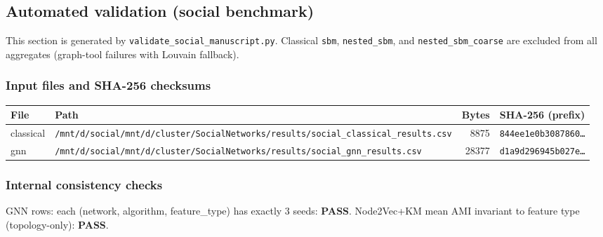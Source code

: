 \subsection{Automated validation (social benchmark)}
This section is generated by \texttt{validate\_social\_manuscript.py}. Classical \texttt{sbm}, \texttt{nested\_sbm}, and \texttt{nested\_sbm\_coarse} are excluded from all aggregates (graph-tool failures with Louvain fallback).
\subsubsection{Input files and SHA-256 checksums}
\footnotesize
\begin{tabular}{lp{8cm}rr}
\toprule
\textbf{File} & \textbf{Path} & \textbf{Bytes} & \textbf{SHA-256 (prefix)} \\
\midrule
classical & \texttt{/mnt/d/social/mnt/d/cluster/SocialNetworks/results/social\_classical\_results.csv} & 8875 & \texttt{844ee1e0b3087860\ldots} \\
gnn & \texttt{/mnt/d/social/mnt/d/cluster/SocialNetworks/results/social\_gnn\_results.csv} & 28377 & \texttt{d1a9d296945b027e\ldots} \\
\bottomrule
\end{tabular}
\normalsize
\subsubsection{Internal consistency checks}
GNN rows: each (network, algorithm, feature\_type) has exactly 3 seeds: \textbf{PASS}.
Node2Vec+KM mean AMI invariant to feature type (topology-only): \textbf{PASS}.
